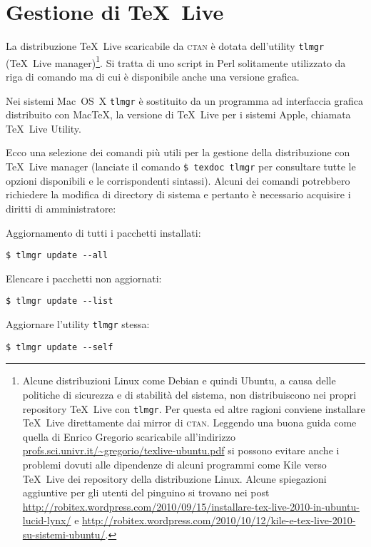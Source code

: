 \section{Gestione di \TeX\ Live}

La distribuzione \TeX\ Live scaricabile da \textsc{ctan} è dotata dell'utility
\texttt{tlmgr} (\TeX\ Live manager)\footnote{Alcune distribuzioni Linux come
Debian e quindi Ubuntu, a causa delle politiche di sicurezza e di stabilità del
sistema, non distribuiscono nei propri repository \TeX\ Live con \texttt{tlmgr}.
Per questa ed altre ragioni conviene installare \TeX\ Live direttamente dai
mirror di \textsc{ctan}. Leggendo una buona guida come quella di Enrico Gregorio
scaricabile all'indirizzo \url{profs.sci.univr.it/~gregorio/texlive-ubuntu.pdf}
si possono evitare anche i problemi dovuti alle dipendenze di alcuni programmi
come Kile verso \TeX~Live dei repository della distribuzione Linux. Alcune
spiegazioni aggiuntive per gli utenti del pinguino si trovano nei post
\url{http://robitex.wordpress.com/2010/09/15/installare-tex-live-2010-in-ubuntu-lucid-lynx/}
e
\url{http://robitex.wordpress.com/2010/10/12/kile-e-tex-live-2010-su-sistemi-ubuntu/}.}.
Si tratta di uno script in Perl solitamente utilizzato da riga di comando ma di
cui è disponibile anche una versione grafica.

Nei sistemi Mac~OS~X \texttt{tlmgr} è sostituito da un programma ad interfaccia
grafica distribuito con Mac\TeX, la versione di \TeX\ Live per i sistemi Apple,
chiamata \TeX{}~Live Utility.

Ecco una selezione dei comandi più utili per la gestione della distribuzione con
\TeX{}~Live manager (lanciate il comando \verb=$ texdoc tlmgr= per consultare
tutte le opzioni disponibili e le corrispondenti sintassi). Alcuni dei comandi
potrebbero richiedere la modifica di directory di sistema e pertanto è
necessario acquisire i diritti di amministratore:

Aggiornamento di tutti i pacchetti installati:
\begin{verbatim}
$ tlmgr update --all
\end{verbatim}

Elencare i pacchetti non aggiornati:
\begin{verbatim}
$ tlmgr update --list
\end{verbatim}

Aggiornare l'utility \texttt{tlmgr} stessa:
\begin{verbatim}
$ tlmgr update --self
\end{verbatim}

